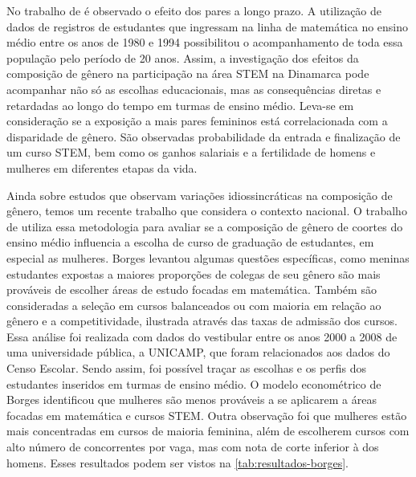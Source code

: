 No trabalho de \citet{Brene2020} é observado o efeito dos pares a longo prazo. A utilização de dados de registros de estudantes que ingressam na linha de matemática no ensino médio entre os anos de 1980 e 1994 possibilitou o acompanhamento de toda essa população pelo período de 20 anos. Assim, a investigação dos efeitos da composição de gênero na participação na área STEM na Dinamarca pode acompanhar não só as escolhas educacionais, mas as consequências diretas e retardadas ao longo do tempo em turmas de ensino médio. Leva-se em consideração se a exposição a mais pares femininos está correlacionada com a disparidade de gênero. São observadas probabilidade da entrada e finalização de um curso STEM, bem como os ganhos salariais e a fertilidade de homens e mulheres em diferentes etapas da vida.

Ainda sobre estudos que observam variações idiossincráticas na composição de gênero, temos um recente trabalho que considera o contexto nacional. O trabalho de \citet{Borges2021} utiliza essa metodologia para avaliar se a composição de gênero de coortes do ensino médio influencia a escolha de curso de graduação de estudantes, em especial as mulheres. Borges levantou algumas questões específicas, como meninas estudantes expostas a maiores proporções de colegas de seu gênero são mais prováveis de escolher áreas de estudo focadas em matemática. Também são consideradas a seleção em cursos balanceados ou com maioria em relação ao gênero e a competitividade, ilustrada através das taxas de admissão dos cursos. Essa análise foi realizada com dados do vestibular entre os anos 2000 a 2008 de uma universidade pública, a UNICAMP, que foram relacionados aos dados do Censo Escolar. Sendo assim, foi possível traçar as escolhas e os perfis dos estudantes inseridos em turmas de ensino médio. O modelo econométrico de Borges identificou que mulheres são menos prováveis a se aplicarem a áreas focadas em matemática e cursos STEM. Outra observação foi que mulheres estão mais concentradas em cursos de maioria feminina, além de escolherem cursos com alto número de concorrentes por vaga, mas com nota de corte inferior à dos homens. Esses resultados podem ser vistos na \autoref{tab:resultados-borges}.

